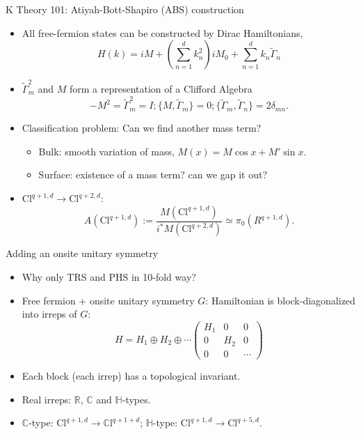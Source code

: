 \documentclass[xcolor=table, 11pt, aspectratio=169]{beamer}
\begin{document}
  \begin{frame}{K Theory 101: Atiyah-Bott-Shapiro (ABS) construction}
    \begin{itemize}
      \item All free-fermion states can be constructed by Dirac Hamiltonians,
      \[H(k)=iM+\left(\sum_{n=1}^d k_n^2\right)iM_0+\sum_{n=1}^d k_n\tilde{\Gamma}_n\]
      \item $\tilde \Gamma_m^2$ and $M$ form a representation of a Clifford Algebra
      \[-M^2=\tilde \Gamma_m^2=I; \{M,\tilde\Gamma_m\}=0;
      \{\tilde\Gamma_m,\tilde\Gamma_n\}=2\delta_{mn}.\]
      \item Classification problem: Can we find another mass term?
      \begin{itemize}
        \item Bulk: smooth variation of mass, $M(x)=M\cos x+M'\sin x$.
        \item Surface: existence of a mass term? can we gap it out?
      \end{itemize}
      \item $\mathrm{Cl}^{q+1,d}\rightarrow\mathrm{Cl}^{q+2,d}$:
      \[A(\mathrm{Cl}^{q+1,d}):=\frac{M(\mathrm{Cl}^{q+1,d})}{i^\ast M(\mathrm{Cl}^{q+2,d})}\simeq\pi_0(R^{q+1,d}).\]
    \end{itemize}
  \end{frame}

  \begin{frame}{Adding an onsite unitary symmetry}
    \begin{itemize}
      \item Why only TRS and PHS in 10-fold way?
      \item Free fermion + onsite unitary symmetry $G$: Hamiltonian is block-diagonalized into irreps of $G$:
      \[H=H_1\oplus H_2\oplus\cdots\begin{pmatrix}
        H_1 & 0 & 0\\
        0 & H_2 & 0\\
        0 & 0 & \cdots
      \end{pmatrix}\]
      \item Each block (each irrep) has a topological invariant.
      \item Real irreps: $\mathbb R$, $\mathbb C$ and $\mathbb H$-types.
      \item $\mathbb C$-type: $\mathrm{Cl}^{q+1,d}\rightarrow \mathbb{C}\mathrm{l}^{q+1+d}$;
      $\mathbb H$-type: $\mathrm{Cl}^{q+1,d}\rightarrow \mathrm{Cl}^{q+5,d}$.
    \end{itemize}
  \end{frame}
\end{document}
